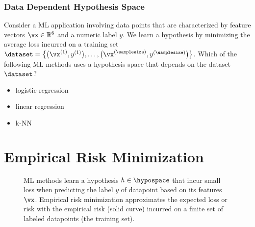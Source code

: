 \documentclass[12pt]{report}
\begin{document}
\subsection{Data Dependent Hypothesis Space} 
\label{exercise_data_dep_hypospace} 
Consider a ML application involving data points that are characterized 
by feature vectors $\vx \in \mathbb{R}^{6}$ and a numeric label $y$. 
We learn a hypothesis by minimizing the average loss incurred on a 
training set $\dataset = \big\{\big(\vx^{(1)},y^{(1)}\big),\ldots,\big(\vx^{(\samplesize)},y^{(\samplesize)}\big)\big\}$. 
Which of the following ML methods uses a hypothesis space that 
depends on the dataset $\dataset$?
\begin{itemize} 
	\item logistic regression 
	\item linear regression 
	\item k-NN 
\end{itemize}


\newpage
\chapter{Empirical Risk Minimization}
\label{ch_Optimization}

\begin{figure}[htbp]
\begin{center}
     \vspace*{-4mm}
\end{center}
\caption{ML methods learn a hypothesis $h \in \hypospace$ that incur small loss 
	when predicting the label $y$ of datapoint based on its features $\vx$. Empirical risk minimization
	 approximates the expected loss or risk with the empirical risk (solid curve) incurred on a 
    finite set of labeled datapoints (the training set).}
\label{fig_ERM_idea}
\end{figure}
\end{document}
